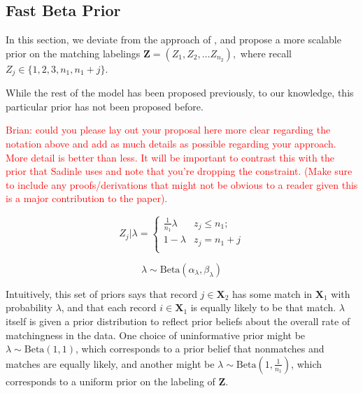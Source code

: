 \documentclass[12pt,letterpaper]{article}
\newcommand{\1}[1]{\mathbb{I}\!\left[#1\right]} %
\begin{document}
\hypertarget{fast-beta-prior}{%
	\subsection{Fast Beta Prior}
	\label{fast-beta-prior}}


In this section, we deviate from the approach of \cite{sadinle_bayesian_2017}, and propose a more scalable prior on the matching labelings $\bm{Z} = (Z_1, Z_2, \ldots Z_{n_2}),$ where recall $Z_j \in \{1,2, 3, n_1, n_1 + j\}.$ 

While the rest of the model has been proposed previously, to our knowledge, this particular prior has not been proposed before. 

\textcolor{red}{Brian: could you please lay out your proposal here more clear regarding the notation above and add as much details as possible regarding your approach. More detail is better than less. It will be important to contrast this with the prior that Sadinle uses and note that you're dropping the constraint. (Make sure to include any proofs/derivations that might not be obvious to a reader given this is a major contribution to the paper).}

\[Z_j | \lambda =
\begin{cases} 
	\frac{1}{n_1}\lambda  & z_j \leq n_1; \\
	1-\lambda &  z_j  = n_1 + j \\
\end{cases}\]

\[\lambda \sim \text{Beta}(\alpha_{\lambda}, \beta_{\lambda}) \] 

{
	\color{blue}
	Intuitively, this set of priors says that record $j \in \bm{X}_2$ has some match in $\bm{X}_1$ with probability $\lambda$, and that each record $i \in \bm{X}_1$ is equally likely to be that match. $\lambda$ itself is given a prior distribution to reflect prior beliefs about the overall rate of matchingness in the data. One choice of uninformative prior might be \(\lambda \sim \text{Beta}(1, 1)\), which corresponds to a prior belief that nonmatches and matches are equally likely, and another might be \(\lambda \sim \text{Beta}\left(1, \frac{1}{n_1}\right)\), which corresponds to a uniform prior on the labeling of \(\mathbf{Z}\).
}

\end{document}
